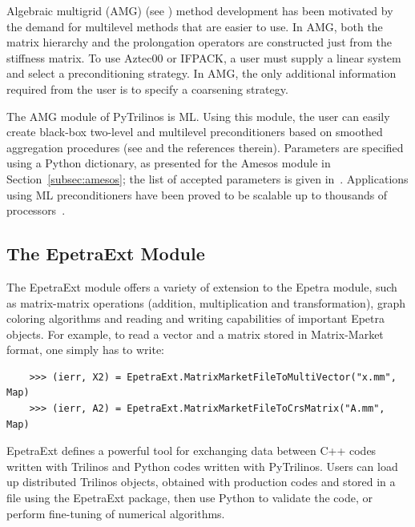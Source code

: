\documentclass[acmtocl]{acmtrans2m}
\newcommand{\PyTrilinos}{{PyTrilinos}}
\begin{document}
Algebraic multigrid (AMG) (see \cite[Section 8]{Briggs}) method
development has been motivated by the demand for multilevel methods
that are easier to use.  In AMG, both the matrix hierarchy and the
prolongation operators are constructed just from the stiffness matrix.
To use Aztec00 or IFPACK, a user must supply a linear system and
select a preconditioning strategy.  In AMG, the only additional
information required from the user is to specify a coarsening
strategy.

The AMG module of PyTrilinos is ML. Using this module,
the user can easily create black-box two-level
and multilevel preconditioners based on smoothed aggregation
procedures (see \cite{sala04analysis,brezina97robust} and the
references therein). Parameters are specified using a Python
dictionary, as presented for the Amesos module in
Section~\ref{subsec:amesos}; the list of accepted parameters is given
in~\cite{ml-guide}. Applications using ML preconditioners have been
proved to be scalable up to thousands of
processors~\cite{ijnme,shadid-jcp-dd-precond}.

\subsection{The EpetraExt Module}
\label{subsec:epetraext}

The EpetraExt module offers a variety of extension to the Epetra
module, such as matrix-matrix operations (addition, multiplication and
transformation), graph coloring algorithms and reading and writing
capabilities of important Epetra objects. For example, to read a
vector and a matrix stored in Matrix-Market format, one simply has to
write:
\begin{verbatim}
    >>> (ierr, X2) = EpetraExt.MatrixMarketFileToMultiVector("x.mm", Map)
    >>> (ierr, A2) = EpetraExt.MatrixMarketFileToCrsMatrix("A.mm", Map)
\end{verbatim}
EpetraExt defines a powerful tool for exchanging data between C++
codes written with Trilinos and Python codes written with
\PyTrilinos. Users can load up distributed Trilinos objects, obtained
with production codes and stored in a file using the EpetraExt
package, then use Python to validate the code, or perform fine-tuning
of numerical algorithms.

\end{document}
